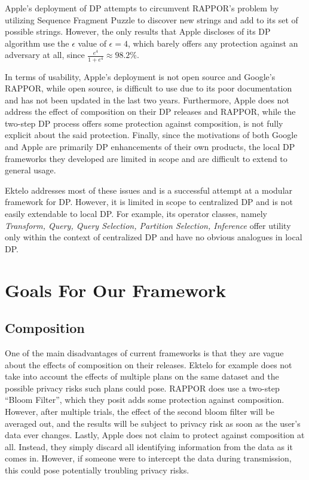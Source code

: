 \documentclass[12pt]{article}
\theoremstyle{definition}
\begin{document}
\bigskip

Apple's deployment of DP attempts to circumvent RAPPOR's problem by utilizing
Sequence Fragment Puzzle to discover new strings and add to its set of possible
strings. However, the only results that Apple discloses of its DP algorithm use
the $\epsilon$ value of $\epsilon = 4$, which barely offers any protection
against an adversary at all, since $\frac{e^4}{1 + e^{4}} \approx 98.2\%$.

\bigskip

In terms of usability, Apple's deployment is not open source and Google's
RAPPOR, while open source, is difficult to use due to its poor documentation
and has not been updated in the last two years. Furthermore, Apple does not
address the effect of composition on their DP releases and RAPPOR, while the
two-step DP process offers some protection against composition, is not fully
explicit about the said protection. Finally, since the motivations of both
Google and Apple are primarily DP enhancements of their own products, the local
DP frameworks they developed are limited in scope and are difficult to extend
to general usage.

\bigskip

Ektelo addresses most of these issues and is a successful attempt at
a modular framework for DP. However, it is limited in scope to centralized DP
and is not easily extendable to local DP. For example, its operator
classes, namely \textit{Transform, Query, Query Selection, Partition
Selection, Inference} offer utility only within the context of centralized DP
and have no obvious analogues in local DP.

\section{Goals For Our Framework}

\subsection{Composition}

\noindent

One of the main disadvantages of current frameworks is that they are vague about the effects of composition on their releases. Ektelo for example does not take into account the effects of multiple plans on the same dataset and the possible privacy risks such plans could pose. RAPPOR does use a two-step ``Bloom Filter'', which they posit adds some protection against composition. However, after multiple trials, the effect of the second bloom filter will be averaged out, and the results will be subject to privacy risk as soon as the user's data ever changes. Lastly, Apple does not claim to protect against composition at all. Instead, they simply discard all identifying information from the data as it comes in. However, if someone were to intercept the data during transmission, this could pose potentially troubling privacy risks.
\end{document}
